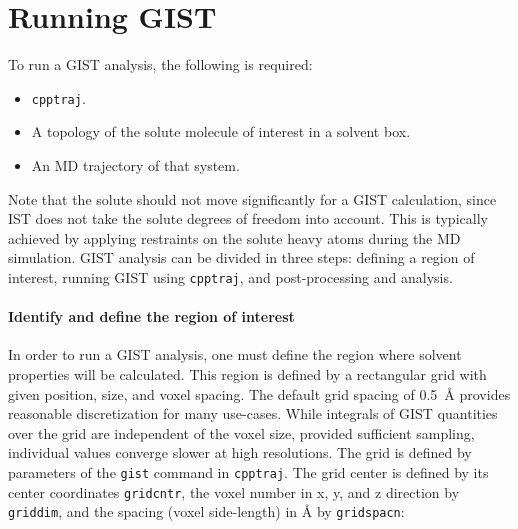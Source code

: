 \documentclass[9pt,tutorial]{livecoms}
\newcommand{\software}{\texttt}
\newcommand\inlinecode{\texttt}
\begin{document}
\section{Running GIST}
\label{sec:running_GIST}
To run a GIST analysis, the following is required:
\begin{itemize}
	\item \software{cpptraj}.
	\item A topology of the solute molecule of interest in a solvent box.
	\item An MD trajectory of that system.
\end{itemize}
Note that the solute should not move significantly for a GIST calculation, since IST does not take the solute degrees of freedom into account.
This is typically achieved by applying restraints on the solute heavy atoms during the MD simulation.
GIST analysis can be divided in three steps: defining a region of interest, running GIST using \software{cpptraj}, and post-processing and analysis.
\cite{Ramsey2016}

\paragraph{Identify and define the region of interest}
In order to run a GIST analysis, one must define the region where solvent properties will be calculated.
This region is defined by a rectangular grid with given position, size, and voxel spacing.
The default grid spacing of \SI{0.5}{\angstrom} provides reasonable discretization for many use-cases.
While integrals of GIST quantities over the grid are independent of the voxel size, provided sufficient sampling, individual values converge slower at high resolutions.
The grid is defined by parameters of the \inlinecode{gist} command in \software{cpptraj}.
The grid center is defined by its center coordinates \inlinecode{gridcntr}, the voxel number in x, y, and z direction by \inlinecode{griddim}, and the spacing (voxel side-length) in \AA{} by \inlinecode{gridspacn}:
\end{document}
